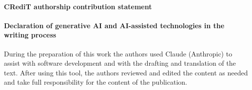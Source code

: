 \paragraph{CRediT authorship contribution statement} 

\paragraph{Declaration of generative AI and AI-assisted technologies in the writing process} During
the preparation of this work the authors used Claude (Anthropic) to assist with software development
and with the drafting and translation of the text. After using this tool, the authors reviewed and
edited the content as needed and take full responsibility for the content of the publication.
\normalsize
